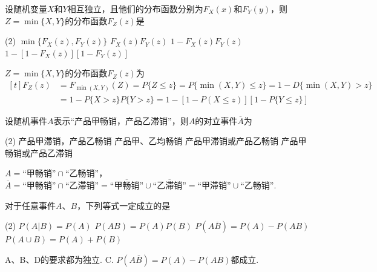 \begin{problem}
    设随机变量$X$和$Y$相互独立，且他们的分布函数分别为$F_X(x)$和$F_Y(y)$，则$Z=\min\{X,Y\}$的分布函数$F_Z(z)$是
    \begin{tasks}(2)
        \task $\min\{F_X(z),F_Y(z)\}$
        \task $F_X(z)F_Y(z)$
        \task $1-F_X(z)F_Y(z)$
        \task[\true] $1-[1-F_X(z)][1-F_Y(z)]$
    \end{tasks}
\end{problem}
\begin{solution}
    $Z=\min\{X,Y\}$的分布函数$F_Z(z)$为
    \[\begin{aligned}[t]
        F_Z(z)&=F_{\min(X,Y)}(Z)=P\{Z\leq z\}=P\{\min(X,Y)\leq z\}=1-D\{\min(X,Y)>z\}\\&=1-P\{X>z\}P\{Y>z\}=1-[1-P(X\leq z)][1-P\{Y\leq z\}]
    \end{aligned}\]
\end{solution}

\begin{problem}
    设随机事件$A$表示``产品甲畅销，产品乙滞销''，则$A$的对立事件$\overline A$为
    \begin{tasks}(2)
        \task 产品甲滞销，产品乙畅销
        \task 产品甲、乙均畅销
        \task[\true] 产品甲滞销或产品乙畅销
        \task 产品甲畅销或产品乙滞销
    \end{tasks}
\end{problem}
\begin{solution}\leavevmode\newline
    $A=\text{``甲畅销''}\cap\text{``乙畅销''}$，$\overline A=\text{``甲畅销''}\cap\text{``乙滞销''}=\overline{\text{``甲畅销''}}\cup\overline{\text{``乙滞销''}}=\text{``甲滞销''}\cup\text{``乙畅销''}$.
\end{solution}

\begin{problem}
    对于任意事件$A$、$B$，下列等式一定成立的是
    \begin{tasks}(2)
        \task $P(A|B)=P(A)$
        \task $P(AB)=P(A)P(B)$
        \task[\true] $P(A\overline B)=P(A)-P(AB)$
        \task $P(A\cup B)=P(A)+P(B)$
    \end{tasks}
\end{problem}
\begin{solution}
    A、B、D的要求都为独立. C. $P(A\overline B)=P(A)-P(AB)$都成立.
\end{solution}

